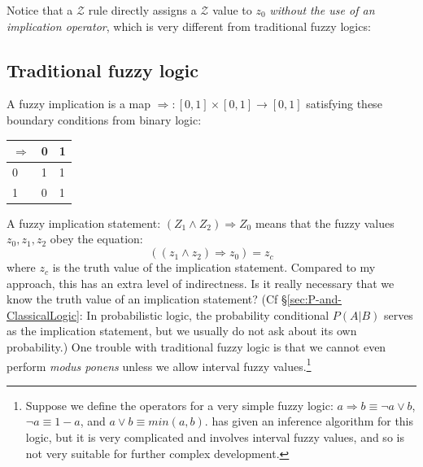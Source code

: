 Notice that a $\mathcal{Z}$ rule directly assigns a $\mathcal{Z}$ value to $z_0$ \textit{without the use of an implication operator}, which is very different from traditional fuzzy logics:

\subsection{Traditional fuzzy logic}

A fuzzy implication is a map $\Rightarrow: [0,1] \times [0,1] \rightarrow [0,1]$ satisfying these boundary conditions from binary logic:\\
\hspace*{1cm} \begin{tabular}{|l|l|l|} \hline
$\Rightarrow$ & 0 & 1\\ \hline
0             & 1 & 1\\
1             & 0 & 1\\ \hline
\end{tabular}

A fuzzy implication statement:  $(Z_1 \wedge Z_2) \Rightarrow Z_0$  means that the fuzzy values $z_0,z_1,z_2$ obey the equation:
$$ ((z_1 \wedge z_2) \Rightarrow z_0) = z_c $$
where $z_c$ is the truth value of the implication statement.  Compared to my approach, this has an extra level of indirectness.  Is it really necessary that we know the truth value of an implication statement?  (Cf \S\ref{sec:P-and-ClassicalLogic}: In probabilistic logic, the probability conditional $P(A|B)$ serves as the implication statement, but we usually do not ask about its own probability.)  One trouble with traditional fuzzy logic is that we cannot even perform \textit{modus ponens} unless we allow interval fuzzy values.\footnote{Suppose we define the operators for a very simple fuzzy logic: $a \Rightarrow b \equiv \neg a \vee b$, $\neg a \equiv 1-a $, and $a \vee b \equiv min(a,b)$.  \citep*{Kenevan1992} has given an inference algorithm for this logic, but it is very complicated and involves interval fuzzy values, and so is not very suitable for further complex development.}




